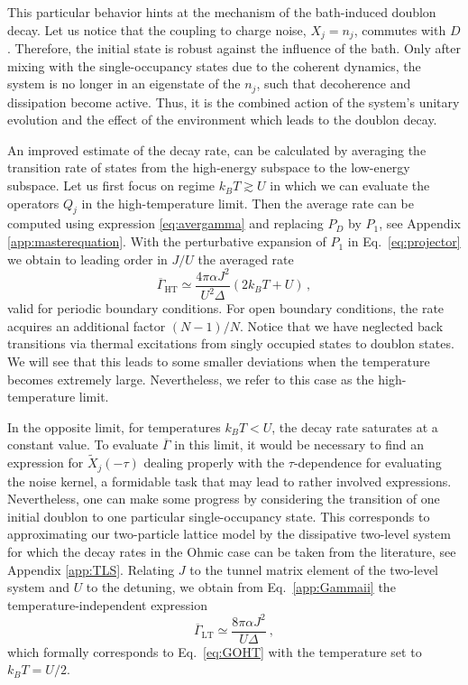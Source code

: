 \documentclass[twocolumn,prb,showpacs]{revtex4-1}
\begin{document}
This particular behavior hints at the mechanism of the bath-induced doublon
decay.  Let us notice that the coupling to charge noise, $X_j=n_j$,
commutes with $D$.  Therefore, the initial state is robust against the
influence of the bath.  Only after mixing with the single-occupancy
states due to the coherent dynamics, the system is no longer in an
eigenstate of the $n_j$, such that decoherence and dissipation become
active.  Thus, it is the combined action of the system's unitary evolution
and the effect of the environment which leads to the doublon decay.

An improved estimate of the decay rate, can be calculated by averaging the
transition rate of states from the high-energy subspace to the low-energy
subspace.  Let us first focus on regime $k_BT\gtrsim U$ in which we can
evaluate the operators $Q_j$ in the high-temperature limit.  Then the
average rate can be computed using expression \eqref{eq:avergamma} and
replacing $P_D$ by $P_1$, see Appendix \ref{app:masterequation}. With the
perturbative expansion of $P_1$ in Eq.~\eqref{eq:projector} we obtain to
leading order in $J/U$ the averaged rate
\begin{equation} 
    \overline{\Gamma}_\mathrm{HT} \simeq 
    \frac{4\pi\alpha J^2}{U^2 \Delta}\left(2k_B T + U \right) \,,
    \label{eq:GOHT}
\end{equation}
valid for periodic boundary conditions.  For open boundary conditions, the
rate acquires an additional factor $(N-1)/N$.  Notice that we have
neglected back transitions via thermal excitations from singly occupied
states to doublon states.  We will see that this leads to some smaller
deviations when the temperature becomes extremely large.  Nevertheless, we
refer to this case as the high-temperature limit.

In the opposite limit, for temperatures ${k_B T < U}$, the decay rate
saturates at a constant value. To evaluate $\overline{\Gamma}$ in this limit, it
would be necessary to find an expression for $\tilde{X}_j(-\tau)$ dealing
properly with the $\tau$-dependence for evaluating the noise kernel, a
formidable task that may lead to rather involved expressions.
Nevertheless, one can make some progress by considering the transition of
one initial doublon to one particular single-occupancy state.  This
corresponds to approximating our two-particle lattice model by the
dissipative two-level system for which the decay rates in the Ohmic case
can be taken from the literature,\cite{Weiss1989a, Makhlin2001b} see
Appendix \ref{app:TLS}.  Relating $J$ to the tunnel matrix element of the
two-level system and $U$ to the detuning, we obtain from
Eq.~\eqref{app:Gammaii} the temperature-independent expression
\begin{equation}
    \overline{\Gamma}_\text{LT}  \simeq \frac{8\pi\alpha J^2}{U \Delta} \ ,
\label{eq:GOLT}
\end{equation}
which formally corresponds to Eq.~\eqref{eq:GOHT} with the temperature set
to $k_B T=U/2$.
\end{document}
